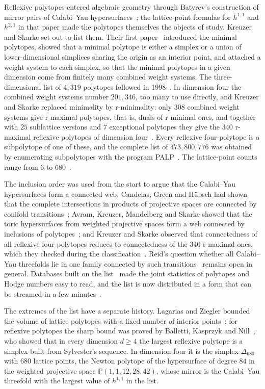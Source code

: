 \documentclass[manuscript]{aomart}
\theoremstyle{definition}
\theoremstyle{remark}
\newcommand{\Dbig}{\Delta_{680}}
\begin{document}
Reflexive polytopes entered algebraic geometry through Batyrev's
construction of mirror pairs of Calabi--Yau hypersurfaces~\cite{Bat94};
the lattice-point formulas for $h^{1,1}$ and $h^{2,1}$ in that paper made
the polytopes themselves the objects of study. Kreuzer and Skarke set out
to list them. Their first paper~\cite{KS97} introduced the minimal
polytopes, showed that a minimal polytope is either a simplex or a union of
lower-dimensional simplices sharing the origin as an interior point, and
attached a weight system to each simplex, so that the minimal polytopes in
a given dimension come from finitely many combined weight systems. The
three-dimensional list of $4{,}319$ polytopes followed in
1998~\cite{KS98}. In dimension four the combined weight systems number
$201{,}346$, too many to use directly, and Kreuzer and Skarke replaced
minimality by r-minimality: only $308$ combined weight systems give
r-maximal polytopes, that is, duals of r-minimal ones, and together with
$25$ sublattice versions and $7$ exceptional polytopes they give the $340$
r-maximal reflexive polytopes of dimension four~\cite{KS00}. Every
reflexive four-polytope is a subpolytope of one of these, and the complete
list of $473{,}800{,}776$ was obtained by enumerating subpolytopes with the
program PALP~\cite{KS04}. The lattice-point counts range from $6$ to
$680$~\cite{KS00}.

The inclusion order was used from the start to argue that the Calabi--Yau
hypersurfaces form a connected web. Candelas, Green and H\"ubsch had shown
that the complete intersections in products of projective spaces are
connected by conifold transitions~\cite{CGH90}; Avram, Kreuzer, Mandelberg
and Skarke showed that the toric hypersurfaces from weighted projective
spaces form a web connected by inclusions of polytopes~\cite{AKMS97}; and
Kreuzer and Skarke observed that connectedness of all reflexive
four-polytopes reduces to connectedness of the $340$ r-maximal ones, which
they checked during the classification~\cite{KS00}. Reid's question whether
all Calabi--Yau threefolds lie in one family connected by such
transitions~\cite{Rei87} remains open in general. Databases built on the
list~\cite{AGHJN15} made the joint statistics of polytopes and Hodge
numbers easy to read, and the list is now distributed in a form that can be
streamed in a few minutes~\cite{HF4D}.

The extremes of the list have a separate history. Lagarias and Ziegler
bounded the volume of lattice polytopes with a fixed number of interior
points~\cite{LZ91}; for reflexive polytopes the sharp bound was proved by
Balletti, Kasprzyk and Nill~\cite{BKN22}, who showed that in every
dimension $d\ge4$ the largest reflexive polytope is a simplex built from
Sylvester's sequence. In dimension four it is the simplex $\Dbig$ with
$680$ lattice points, the Newton polytope of the hypersurface of degree
$84$ in the weighted projective space $\mathbb{P}(1,1,12,28,42)$, whose
mirror is the Calabi--Yau threefold with the largest value of $h^{1,1}$ in
the list.
\end{document}
